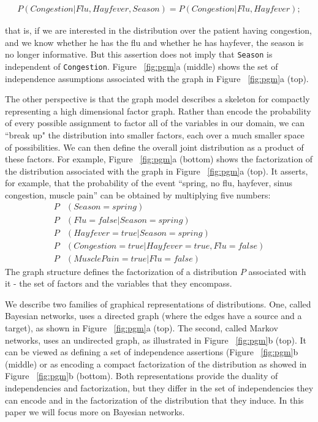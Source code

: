 \begin{align*}
P(Congestion | Flu, Hayfever, Season) = P(Congestion | Flu, Hayfever);
\end{align*}

that is, if we are interested in the distribution over the patient having congestion, and we know whether he has the flu and whether he has hayfever, the season is no longer informative. But this assertion does not imply that \texttt{Season} is independent of \texttt{Congestion}. Figure ~\ref{fig:pgm}a (middle) shows the set of independence assumptions associated with the graph in Figure ~\ref{fig:pgm}a (top).

The other perspective is that the graph model describes a skeleton for compactly representing a high dimensional factor graph. Rather than encode the probability of every possible assignment to factor all of the variables in our domain, we can ``break up" the distribution into smaller factors, each over a much smaller space of possibilities. We can then deﬁne the overall joint distribution as a product of these factors. For example, Figure ~\ref{fig:pgm}a (bottom) shows the factorization of the distribution associated with the graph in Figure ~\ref{fig:pgm}a (top). It asserts, for example, that the probability of the event “spring, no flu, hayfever, sinus congestion, muscle pain” can be obtained by multiplying five numbers:
\begin{align*}
  P&(Season = spring)\\
  P&(Flu = false | Season = spring)\\
  P&(Hayfever = true | Season = spring)\\
  P&(Congestion = true | Hayfever = true,Flu = false)\\
  P&(Muscle Pain = true | Flu = false)
\end{align*}
The graph structure deﬁnes the factorization of a distribution $P$ associated with it - the set of factors and the variables that they encompass.

We describe two families of graphical representations of distributions. One, called Bayesian networks, uses a directed graph (where the edges have a source and a target), as shown in Figure ~\ref{fig:pgm}a (top). The second, called Markov networks, uses an undirected graph, as illustrated in Figure ~\ref{fig:pgm}b (top). It can be viewed as defining a set of independence assertions (Figure ~\ref{fig:pgm}b (middle) or as encoding a compact factorization of the distribution as showed in Figure ~\ref{fig:pgm}b (bottom). Both representations provide the duality of independencies and factorization, but they diﬀer in the set of independencies they can encode and in the factorization of the distribution that they induce. In this paper we will focus more on Bayesian networks.

